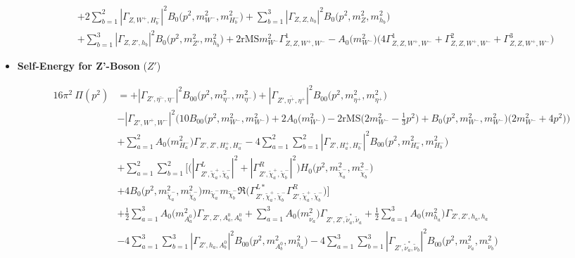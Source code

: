 \begin{itemize}
\begin{align}
 &+2 \sum_{b=1}^{2}|{\Gamma_{Z,W^+,H^-_{{b}}}}|^2 {B_0\Big(p^{2},m^2_{W^-},m^2_{H^-_{{b}}}\Big)}  +\sum_{b=1}^{3}|{\Gamma_{Z,Z,h_{{b}}}}|^2 {B_0\Big(p^{2},m^2_{Z},m^2_{h_{{b}}}\Big)} \nonumber \\ 
 &+\sum_{b=1}^{3}|{\Gamma_{Z,{Z'},h_{{b}}}}|^2 {B_0\Big(p^{2},m^2_{{Z'}},m^2_{h_{{b}}}\Big)} +2 \text{rMS} m^2_{W^-} {\Gamma^{1}_{Z,Z,W^+,W^-}} - {A_0\Big(m^2_{W^-}\Big)} \Big(4 {\Gamma^{1}_{Z,Z,W^+,W^-}}  + {\Gamma^{2}_{Z,Z,W^+,W^-}} + {\Gamma^{3}_{Z,Z,W^+,W^-}}\Big) 
\end{align} 
\item {\bf Self-Energy for Z'-Boson} \thickspace (\({Z'}\)) 

\begin{align} 
16\pi^2 \ \Pi(p^2) &= +|{\Gamma_{{Z'},\bar{\eta^-},\eta^-}}|^2 {B_{00}\Big(p^{2},m^2_{\eta^-},m^2_{\eta^-}\Big)} +|{\Gamma_{{Z'},\bar{\eta^+},\eta^+}}|^2 {B_{00}\Big(p^{2},m^2_{\eta^+},m^2_{\eta^+}\Big)} \nonumber \\ 
 &- |{\Gamma_{{Z'},W^+,W^-}}|^2 \Big(10 {B_{00}\Big(p^{2},m^2_{W^-},m^2_{W^-}\Big)}  + 2 {A_0\Big(m^2_{W^-}\Big)}  -2 \text{rMS} \Big(2 m^2_{W^-}  -\frac{1}{3} p^{2} \Big) + {B_0\Big(p^{2},m^2_{W^-},m^2_{W^-}\Big)} \Big(2 m^2_{W^-}  + 4 p^{2} \Big)\Big)\nonumber \\ 
 &+\sum_{a=1}^{2}{A_0\Big(m^2_{H^-_{{a}}}\Big)} {\Gamma_{{Z'},{Z'},H^+_{{a}},H^-_{{a}}}} -4 \sum_{a=1}^{2}\sum_{b=1}^{2}|{\Gamma_{{Z'},H^+_{{a}},H^-_{{b}}}}|^2 {B_{00}\Big(p^{2},m^2_{H^-_{{a}}},m^2_{H^-_{{b}}}\Big)}  \nonumber \\ 
 &+\sum_{a=1}^{2}\sum_{b=1}^{2} \Big[\Big(|{\Gamma^L_{{Z'},\tilde{\chi}^+_{{a}},\tilde{\chi}^-_{{b}}}}|^2 + |{\Gamma^R_{{Z'},\tilde{\chi}^+_{{a}},\tilde{\chi}^-_{{b}}}}|^2\Big){H_0\Big(p^{2},m^2_{\tilde{\chi}^-_{{a}}},m^2_{\tilde{\chi}^-_{{b}}}\Big)} \nonumber \\ & +4 {B_0\Big(p^{2},m^2_{\tilde{\chi}^-_{{a}}},m^2_{\tilde{\chi}^-_{{b}}}\Big)} m_{\tilde{\chi}^-_{{a}}} m_{\tilde{\chi}^-_{{b}}} {\Re\Big({\Gamma^{L*}_{{Z'},\tilde{\chi}^+_{{a}},\tilde{\chi}^-_{{b}}}} {\Gamma^R_{{Z'},\tilde{\chi}^+_{{a}},\tilde{\chi}^-_{{b}}}} \Big)} \Big]\nonumber \\ 
 &+\frac{1}{2} \sum_{a=1}^{3}{A_0\Big(m^2_{A^0_{{a}}}\Big)} {\Gamma_{{Z'},{Z'},A^0_{{a}},A^0_{{a}}}}  +\sum_{a=1}^{3}{A_0\Big(m^2_{\tilde{\nu}_{{a}}}\Big)} {\Gamma_{{Z'},{Z'},\tilde{\nu}^*_{{a}},\tilde{\nu}_{{a}}}} +\frac{1}{2} \sum_{a=1}^{3}{A_0\Big(m^2_{h_{{a}}}\Big)} {\Gamma_{{Z'},{Z'},h_{{a}},h_{{a}}}}  \nonumber \\ 
 &-4 \sum_{a=1}^{3}\sum_{b=1}^{3}|{\Gamma_{{Z'},h_{{a}},A^0_{{b}}}}|^2 {B_{00}\Big(p^{2},m^2_{A^0_{{b}}},m^2_{h_{{a}}}\Big)}  -4 \sum_{a=1}^{3}\sum_{b=1}^{3}|{\Gamma_{{Z'},\tilde{\nu}^*_{{a}},\tilde{\nu}_{{b}}}}|^2 {B_{00}\Big(p^{2},m^2_{\tilde{\nu}_{{a}}},m^2_{\tilde{\nu}_{{b}}}\Big)}  \nonumber \\ 

\end{align}
\end{itemize}
